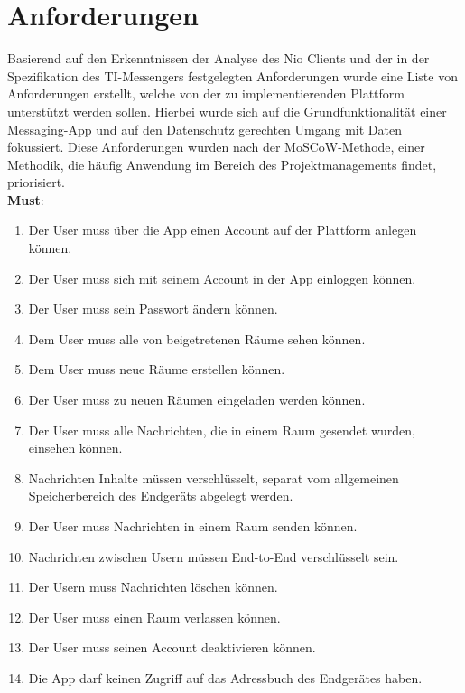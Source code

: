    \section{Anforderungen}\label{sec:anforderungen}
    Basierend auf den Erkenntnissen der Analyse des Nio Clients und der in der Spezifikation des TI-Messengers festgelegten Anforderungen wurde eine Liste von Anforderungen erstellt, welche von der zu implementierenden Plattform unterstützt werden sollen.
    Hierbei wurde sich auf die Grundfunktionalität einer Messaging-App und auf den Datenschutz gerechten Umgang mit Daten fokussiert.
    Diese Anforderungen wurden nach der MoSCoW-Methode, einer Methodik, die häufig Anwendung im Bereich des Projektmanagements findet, priorisiert.\\
    \textbf{Must}:
    \begin{enumerate}[label={\roman*.}, leftmargin=2.5cm]
        \item Der User muss über die App einen Account auf der Plattform anlegen können.
        \item Der User muss sich mit seinem Account in der App einloggen können.
        \item Der User muss sein Passwort ändern können.
        \item Dem User muss alle von beigetretenen Räume sehen können.
        \item Dem User muss neue Räume erstellen können.
        \item Der User muss zu neuen Räumen eingeladen werden können.
        \item Der User muss alle Nachrichten, die in einem Raum gesendet wurden, einsehen können.
        \item Nachrichten Inhalte müssen verschlüsselt, separat vom allgemeinen Speicherbereich des Endgeräts abgelegt werden.
        \item Der User muss Nachrichten in einem Raum senden können.
        \item Nachrichten zwischen Usern müssen End-to-End verschlüsselt sein.
        \item Der Usern muss Nachrichten löschen können.
        \item Der User muss einen Raum verlassen können.
        \item Der User muss seinen Account deaktivieren können.
        \item Die App darf keinen Zugriff auf das Adressbuch des Endgerätes haben.
    \end{enumerate}


